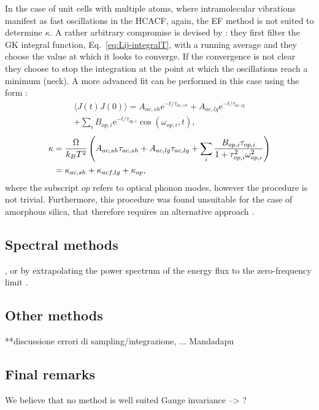 In the case of unit cells with multiple atoms, where intramolecular vibrations manifest as fast oscillations in the HCACF, again, the EF method is not suited to determine $\kappa$. A rather arbitrary compromise is devised by \citet{McGaughey2004b}: they first filter the GK integral function, Eq.~\eqref{eq:Lij-integralT}, with a running average \cite{MovingAverage} and they choose the value at which it looks to converge. If the convergence is not clear they choose to stop the integration at the point at which the oscillations reach a minimum (neck). A more advanced fit can be performed in this case using the form \cite{McGaughey2004b}:
\begin{multline}
    \langle J(t) J(0) \rangle = A_{ac,sh} \mathrm{e}^{-t/\tau_{ac,sh}} + A_{ac,lg} \mathrm{e}^{-t/\tau_{ac,lg}} \\
        + \sum_i B_{op,i} \mathrm{e}^{-t/\tau_{op,i}} \cos(\omega_{op,i},t),
\end{multline}
\begin{equation}
    \begin{aligned}
        \kappa &= \frac{{\mathrm\Omega}}{k_B T^2} \left(A_{ac,sh}\tau_{ac,sh} + A_{ac,lg}\tau_{ac,lg} + \sum_i \frac{B_{op,i}\tau_{op,i}}{1+\tau_{op,i}^2\omega_{op,i}^2}\right) \\
        &= \kappa_{ac,sh} + \kappa_{acf,lg} + \kappa_{op},
    \end{aligned}
\end{equation}
where the subscript $op$ refers to optical phonon modes, however the procedure is not trivial. Furthermore, this procedure was found unsuitable for the case of amorphous silica, that therefore requires an alternative approach \cite{McGaughey2004b}.


\subsection{Spectral methods}
, or by extrapolating the power spectrum of the energy flux to the zero-frequency limit \citep{Volz2000}. 

\subsection{Other methods}
**discussione errori di sampling/integrazione, ... Mandadapu

\subsection{Final remarks}
We believe that no method is well suited
Gauge invariance --> ?

